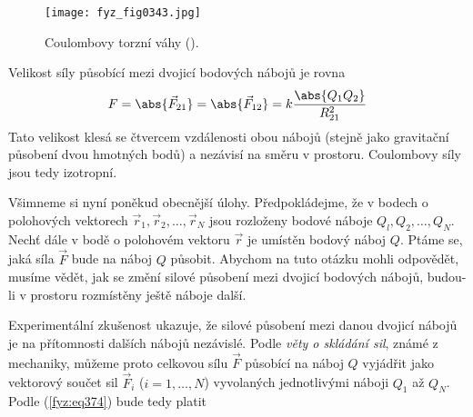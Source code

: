     \begin{figure}[ht!]  %
      \centering
      \texttt{[image: fyz\_fig0343.jpg]}
      \caption{Coulombovy torzní váhy (\cite[s.~294]{Feynman02}).}
      \label{fyz:fig0343}
    \end{figure}
    
    Velikost síly působící mezi dvojicí bodových nábojů je rovna
    \begin{equation}\label{fyz:eq375}
      F = \abs{\vec{F}_{21}} = \abs{\vec{F}_{12}} = k\frac{\abs{Q_1Q_2}}{R_{21}^2}
    \end{equation}
    Tato velikost klesá se čtvercem vzdálenosti obou nábojů (stejně jako gravitační působení dvou
    hmotných bodů) a nezávisí na směru v prostoru. Coulombovy síly jsou tedy izotropní.
    
    Všimneme si nyní poněkud obecnější úlohy. Předpokládejme, že v bodech o polohových vektorech
    \(\vec{r}_1, \vec{r}_2, \ldots, \vec{r}_N\) jsou rozloženy bodové náboje \(Q_l, Q_2, \ldots,
    Q_N\). Nechť dále v bodě o polohovém vektoru \(\vec{r}\) je umístěn bodový náboj \(Q\). Ptáme
    se, jaká síla \(\vec{F}\) bude na náboj \(Q\) působit. Abychom na tuto otázku mohli odpovědět,
    musíme vědět, jak se změní silové působení mezi dvojicí bodových nábojů, budou-li v prostoru
    rozmístěny ještě náboje další. 
    
    Experimentální zkušenost ukazuje, že silové působení mezi danou dvojicí nábojů je na přítomnosti
    dalších nábojů nezávislé. Podle \emph{věty o skládání sil}, známé z mechaniky, můžeme proto
    celkovou sílu \(\vec{F}\) působící na náboj \(Q\) vyjádřit jako vektorový součet sil
    \(\vec{F}_i\) (\(i = 1, \ldots,N\)) vyvolaných jednotlivými náboji \(Q_1\) až \(Q_N\). Podle
    (\ref{fyz:eq374}) bude tedy platit
    
